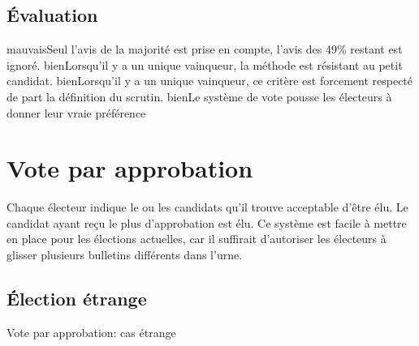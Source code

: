 \documentclass[../report]{subfiles}
\begin{document}
  \subsection{Évaluation}
  \tabcritere%
    {mauvais}{Seul l'avis de la majorité est prise en compte, l'avis des 49\% restant est ignoré.}%
    {bien}{Lorsqu'il y a un unique vainqueur, la méthode est résistant au petit candidat.}%
    {bien}{Lorsqu'il y a un unique vainqueur, ce critère est forcement respecté de part la définition du scrutin.}%
    {bien}{Le système de vote pousse les électeurs à donner leur vraie préférence}


  \section{Vote par approbation}

  Chaque électeur indique le ou les candidats qu'il trouve acceptable d'être élu.
  Le candidat ayant reçu le plus d'approbation est élu.
  Ce système est facile à mettre en place pour les élections actuelles, car il suffirait d'autoriser
  les électeurs à glisser plusieurs bulletins différents dans l'urne.

  \subsection{Élection étrange}

  \begin{table}[h]
    \begin{center}
      \caption{Vote par approbation: cas étrange}%
      \label{fig:diff:appro:caslim1}
    \end{center}
  \end{table}
\end{document}
